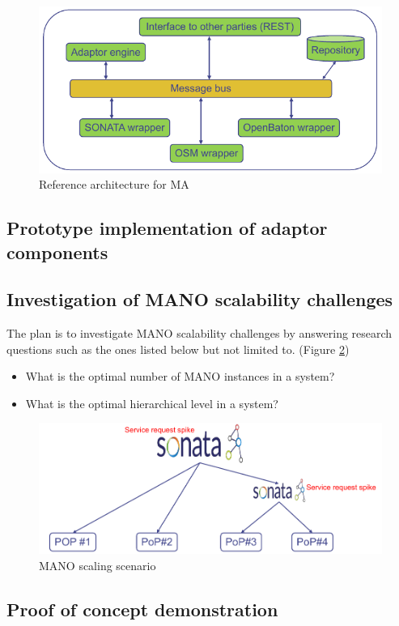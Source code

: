 \begin{figure}[h]
	\centering
	\includegraphics[width=0.9\linewidth]{figures/wp3Arch}
	\caption{Reference architecture for MA}
	\label{fig:wp3arch}
\end{figure}

\subsection{Prototype implementation of adaptor components}
\paragraph{}

\subsection{Investigation of MANO scalability challenges}
\label{wp3manoresearch}
The plan is to investigate MANO scalability challenges by answering research questions such as the ones listed below but not limited to. (Figure \ref{fig:wp3manoscale})
\begin{itemize}
	\item What is the optimal number of MANO instances in a system?
	\item What is the optimal hierarchical level in a system?
\end{itemize}

\begin{figure}[h]
	\centering
	\includegraphics[width=0.9\linewidth]{figures/wp3manoScale}
	\caption{MANO scaling scenario}
	\label{fig:wp3manoscale}
\end{figure}



\subsection{Proof of concept demonstration}

